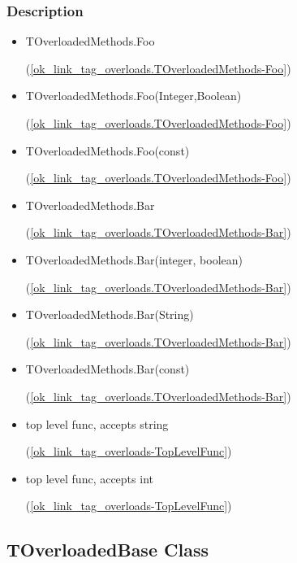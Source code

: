 \documentclass{report}
\newif\ifpdf
\begin{document}
\subsubsection*{\large{\textbf{Description}}\normalsize\hspace{1ex}\hfill}
\begin{itemize}
\item \begin{ttfamily}TOverloadedMethods.Foo\end{ttfamily}(\ref{ok_link_tag_overloads.TOverloadedMethods-Foo})
\item \begin{ttfamily}TOverloadedMethods.Foo(Integer,Boolean)\end{ttfamily}(\ref{ok_link_tag_overloads.TOverloadedMethods-Foo})
\item \begin{ttfamily}TOverloadedMethods.Foo(const)\end{ttfamily}(\ref{ok_link_tag_overloads.TOverloadedMethods-Foo})
\item \begin{ttfamily}TOverloadedMethods.Bar\end{ttfamily}(\ref{ok_link_tag_overloads.TOverloadedMethods-Bar})
\item \begin{ttfamily}TOverloadedMethods.Bar(integer, boolean)\end{ttfamily}(\ref{ok_link_tag_overloads.TOverloadedMethods-Bar})
\item \begin{ttfamily}TOverloadedMethods.Bar(String)\end{ttfamily}(\ref{ok_link_tag_overloads.TOverloadedMethods-Bar})
\item \begin{ttfamily}TOverloadedMethods.Bar(const)\end{ttfamily}(\ref{ok_link_tag_overloads.TOverloadedMethods-Bar})
\item \begin{ttfamily}top level func, accepts string\end{ttfamily}(\ref{ok_link_tag_overloads-TopLevelFunc})
\item \begin{ttfamily}top level func, accepts int\end{ttfamily}(\ref{ok_link_tag_overloads-TopLevelFunc})
\end{itemize}\ifpdf
\subsection*{\large{\textbf{TOverloadedBase Class}}\normalsize\hspace{1ex}\hrulefill}
\else
\end{document}
